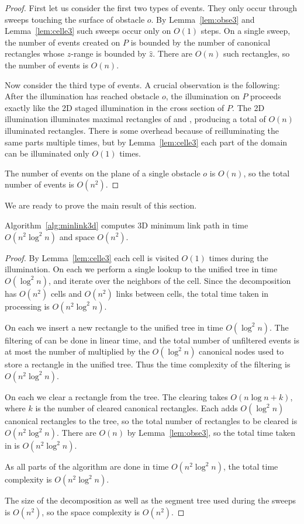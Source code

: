 \documentclass[english,gradu]{tktltiki2018}
\begin{document}
\begin{proof}
First let us consider the first two types of events.
They only occur through sweeps touching the surface of obstacle $o$.
By Lemma~\ref{lem:obse3} and Lemma~\ref{lem:celle3} such sweeps occur only on $O(1)$ steps.
On a single sweep, the number of events created on $P$ is bounded by the number of canonical rectangles whose $z$-range is bounded by $\hat{z}$.
There are $O(n)$ such rectangles, so the number of events is $O(n)$.

Now consider the third type of events.
A crucial observation is the following:
After the illumination has reached obstacle $o$, the illumination on $P$ proceeds exactly like the 2D staged illumination in the cross section of $P$.
The 2D illumination illuminates maximal rectangles of  and , producing a total of $O(n)$ illuminated rectangles.
There is some overhead because of reilluminating the same parts multiple times, but by Lemma~\ref{lem:celle3} each part of the domain can be illuminated only $O(1)$ times.

The number of events on the plane of a single obstacle $o$ is $O(n)$, so the total number of events is $O(n^2)$.
\end{proof}

We are ready to prove the main result of this section.

\begin{theo}Algorithm~\ref{alg:minlink3d} computes 3D minimum link path in time $O(n^2\log^2n)$ and space $O(n^2)$.\end{theo}
\begin{proof}
By Lemma~\ref{lem:celle3} each cell is visited $O(1)$ times during the illumination.
On each \cellE we perform a single lookup to the unified tree in time $O(\log^2 n)$, and iterate over the neighbors of the cell.
Since the decomposition has $O(n^2)$ cells and $O(n^2)$ links between cells, the total time taken in processing \cellEs is $O(n^2\log^2 n)$.

On each \addE we insert a new rectangle to the unified tree in time $O(\log^2 n)$.
The filtering of \addEs can be done in linear time, and the total number of unfiltered events is at most the number of \addEs multiplied by the $O(\log^2 n)$ canonical nodes used to store a rectangle in the unified tree.
Thus the time complexity of the filtering is $O(n^2\log^2 n)$.

On each \obsE we clear a rectangle from the tree.
The clearing takes $O(n\log n + k)$, where $k$ is the number of cleared canonical rectangles.
Each \addE adds $O(\log^2 n)$ canonical rectangles to the tree, so the total number of rectangles to be cleared is $O(n^2\log^2 n)$.
There are $O(n)$ \obsEs by Lemma~\ref{lem:obse3}, so the total time taken in \obsEs is $O(n^2\log^2 n)$.

As all parts of the algorithm are done in time $O(n^2\log^2 n)$, the total time complexity is $O(n^2\log^2 n)$.

The size of the decomposition as well as the segment tree used during the sweeps is $O(n^2)$, so the space complexity is $O(n^2)$.
\end{proof}
\end{document}
